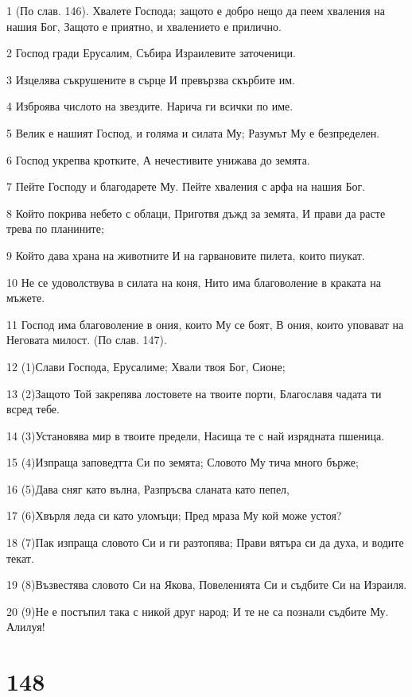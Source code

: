 \par 1 (По слав. 146). Хвалете Господа; защото е добро нещо да пеем хваления на нашия Бог, Защото е приятно, и хвалението е прилично.
\par 2 Господ гради Ерусалим, Събира Израилевите заточеници.
\par 3 Изцелява съкрушените в сърце И превързва скърбите им.
\par 4 Изброява числото на звездите. Нарича ги всички по име.
\par 5 Велик е нашият Господ, и голяма и силата Му; Разумът Му е безпределен.
\par 6 Господ укрепва кротките, А нечестивите унижава до земята.
\par 7 Пейте Господу и благодарете Му. Пейте хваления с арфа на нашия Бог.
\par 8 Който покрива небето с облаци, Приготвя дъжд за земята, И прави да расте трева по планините;
\par 9 Който дава храна на животните И на гарвановите пилета, които пиукат.
\par 10 Не се удоволствува в силата на коня, Нито има благоволение в краката на мъжете.
\par 11 Господ има благоволение в ония, които Му се боят, В ония, които уповават на Неговата милост. (По слав. 147).
\par 12 (1)Слави Господа, Ерусалиме; Хвали твоя Бог, Сионе;
\par 13 (2)Защото Той закрепява лостовете на твоите порти, Благославя чадата ти всред тебе.
\par 14 (3)Установява мир в твоите предели, Насища те с най изрядната пшеница.
\par 15 (4)Изпраща заповедтта Си по земята; Словото Му тича много бърже;
\par 16 (5)Дава сняг като вълна, Разпръсва сланата като пепел,
\par 17 (6)Хвърля леда си като уломъци; Пред мраза Му кой може устоя?
\par 18 (7)Пак изпраща словото Си и ги разтопява; Прави вятъра си да духа, и водите текат.
\par 19 (8)Възвестява словото Си на Якова, Повеленията Си и съдбите Си на Израиля.
\par 20 (9)Не е постъпил така с никой друг народ; И те не са познали съдбите Му. Алилуя!

\chapter{148}

